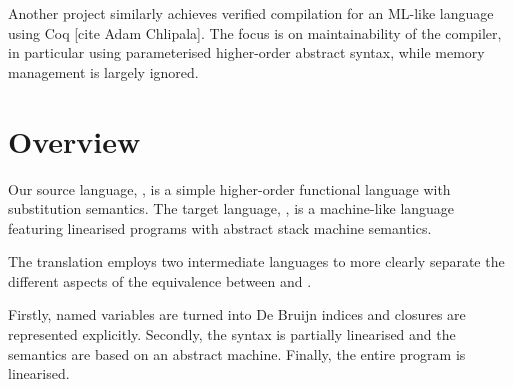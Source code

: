 Another project similarly achieves verified compilation for an ML-like language using Coq [cite Adam Chlipala].
The focus is on maintainability of the compiler, in particular using parameterised higher-order abstract syntax, while memory management is largely ignored.



\section{Overview}
Our source language, \hlang, is a simple higher-order functional language with substitution semantics.
The target language, \mlang, is a machine-like language featuring linearised programs with abstract stack machine semantics.

The translation employs two intermediate languages to more clearly separate the different aspects of the equivalence between \hlang and \mlang.

Firstly, named variables are turned into De Bruijn indices and closures are represented explicitly.
Secondly, the syntax is partially linearised and the semantics are based on an abstract machine.
Finally, the entire program is linearised.

